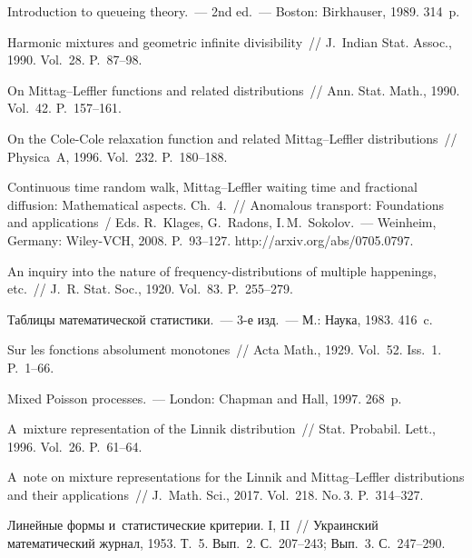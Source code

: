 \begin{multicols}{2}
{{\begin{thebibliography}{99}
Introduction to queueing theory.~--- 2nd ed.~--- Boston: Birkhauser, 1989.
314~p.

 Harmonic mixtures and geometric infinite
divisibility~// J.~Indian Stat. Assoc., 1990.
Vol.~28. P.~87--98.

 On Mittag--Leffler functions and related
distributions~// Ann. Stat. Math.,
1990. Vol.~42. P.~157--161.

On the Cole-Cole relaxation function and
related Mittag--Leffler distributions~// Physica~A, 1996. Vol.~232.
P.~180--188.

Continuous time random walk,
Mittag--Leffler waiting time and fractional diffusion: Mathematical
aspects. Ch.~4.~// Anomalous transport: Foundations and applications~/ 
Eds. R.~Klages, G.~Ra\-dons, I.\,M.~Sokolov.~--- Weinheim, Germany: 
Wiley-VCH, 2008.   P.~93--127.
{\sf http://arxiv.org/abs/0705.0797}.

 An inquiry into the nature of
frequency-distributions of multiple happenings, etc.~// J.~R.
Stat. Soc., 1920. Vol.~83. P.~255--279.

 Таблицы
математической статистики.~--- 3-е изд.~--- М.: Наука, 1983.
416~c.

 Sur les fonctions absolument
monotones~// Acta Math., 1929. Vol.~52. Iss.~1. P.~1--66.

 Mixed Poisson processes.~--- London: Chapman and
Hall, 1997. 268~p.

A~mixture representation of the Linnik distribution~// 
Stat. Probabil. Lett., 1996. Vol.~26. P.~61--64.

A~note on mixture representations for the Linnik and Mittag--Leffler
distributions and their applications~// J.~Math. Sci., 2017. 
Vol.~218. No.\,3. P.~314--327.

 Линейные формы и~статистические
критерии. I, II~// Украинский математический журнал, 1953. Т.~5.
Вып.~2. С.~207--243; Вып.~3. С.~247--290.


\end{thebibliography}}}
\end{multicols}
